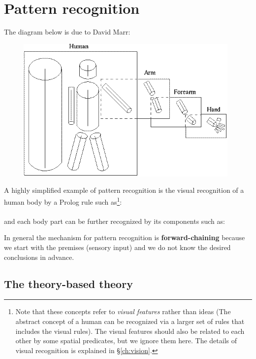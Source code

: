 \chapter{Pattern recognition}
\label{ch:pattern-recognition}
\minitoc

The diagram below is due to David Marr:
\begin{figure}[H]
\centering
\includegraphics[scale=0.7, viewport=0 0 414 269]{Marr3DModel.PNG}
\end{figure}

A highly simplified example of pattern recognition is the visual recognition of a human body by a Prolog rule such as\footnote{
Note that these concepts refer to \textit{visual features} rather than ideas  (The abstract concept of a human can be recognized via a larger set of rules that includes the visual rules).  The visual features should also be related to each other by some spatial predicates, but we ignore them here.  The details of visual recognition is explained in \S\ref{ch:vision}.
}:\\
\hspace*{1cm} \\
and each body part can be further recognized by its components such as:\\
\hspace*{1cm} 

In general the mechanism for pattern recognition is \textbf{forward-chaining} because we start with the premises (sensory input) and we do not know the desired conclusions in advance.

\section{The theory-based theory}

